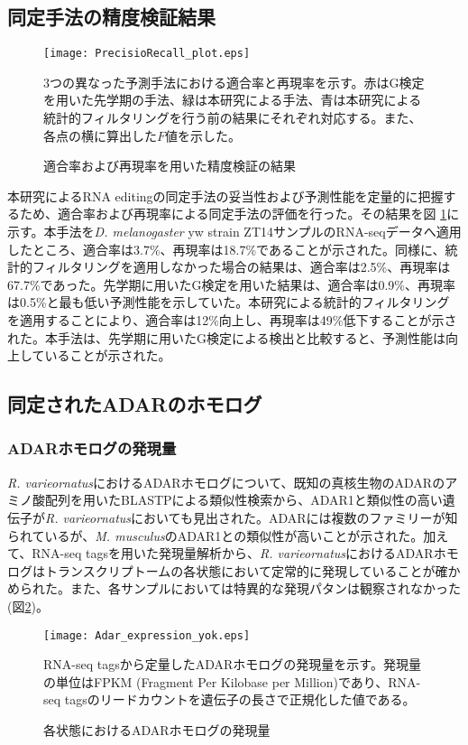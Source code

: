 \subsection{同定手法の精度検証結果}
	\begin{figure}[!h]
		\centering
		\texttt{[image: PrecisioRecall\_plot.eps]}
		\caption{適合率および再現率を用いた精度検証の結果}
		\begin{flushleft}
		\small{3つの異なった予測手法における適合率と再現率を示す。赤はG検定を用いた先学期の手法、緑は本研究による手法、青は本研究による統計的フィルタリングを行う前の結果にそれぞれ対応する。また、各点の横に算出した$F$値を示した。}
		\end{flushleft}
		\label{fig:predac}
	\end{figure}
本研究によるRNA editingの同定手法の妥当性および予測性能を定量的に把握するため、適合率および再現率による同定手法の評価を行った。その結果を図 \ref{fig:predac}に示す。本手法を{\it D. melanogaster} yw strain ZT14サンプルのRNA-seqデータへ適用したところ、適合率は3.7\%、再現率は18.7\%であることが示された。同様に、統計的フィルタリングを適用しなかった場合の結果は、適合率は2.5\%、再現率は67.7\%であった。先学期に用いたG検定を用いた結果は、適合率は0.9\%、再現率は0.5\%と最も低い予測性能を示していた。本研究による統計的フィルタリングを適用することにより、適合率は12\%向上し、再現率は49\%低下することが示された。本手法は、先学期に用いたG検定による検出と比較すると、予測性能は向上していることが示された。

\subsection{同定されたADARのホモログ}
\subsubsection{ADARホモログの発現量}
{\it R. varieornatus}におけるADARホモログについて、既知の真核生物のADARのアミノ酸配列を用いたBLASTPによる類似性検索から、ADAR1と類似性の高い遺伝子が{\it R. varieornatus}においても見出された。ADARには複数のファミリーが知られているが、{\it M. musculus}のADAR1との類似性が高いことが示された。加えて、RNA-seq tagsを用いた発現量解析から、{\it R. varieornatus}におけるADARホモログはトランスクリプトームの各状態において定常的に発現していることが確かめられた。また、各サンプルにおいては特異的な発現パタンは観察されなかった (図\ref {fig:ExpAdar})。

\begin{figure}[!h]
	\centering
	\texttt{[image: Adar\_expression\_yok.eps]}
	\caption{各状態におけるADARホモログの発現量}
	\begin{flushleft}
		\small{RNA-seq tagsから定量したADARホモログの発現量を示す。発現量の単位はFPKM (Fragment Per Kilobase per Million)であり、RNA-seq tagsのリードカウントを遺伝子の長さで正規化した値である。}
	\end{flushleft}
	\label{fig:ExpAdar}
\end{figure}

